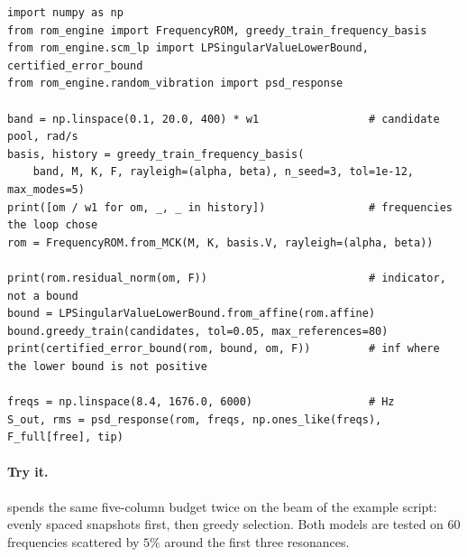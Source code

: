 \begin{lstlisting}[caption={Greedy training, the reduced model, indicators, a certified bound and a random-vibration RMS (K, M, C are free-dof matrices; F the load pattern).},label={lst:fr-run}]
import numpy as np
from rom_engine import FrequencyROM, greedy_train_frequency_basis
from rom_engine.scm_lp import LPSingularValueLowerBound, certified_error_bound
from rom_engine.random_vibration import psd_response

band = np.linspace(0.1, 20.0, 400) * w1                 # candidate pool, rad/s
basis, history = greedy_train_frequency_basis(
    band, M, K, F, rayleigh=(alpha, beta), n_seed=3, tol=1e-12, max_modes=5)
print([om / w1 for om, _, _ in history])                # frequencies the loop chose
rom = FrequencyROM.from_MCK(M, K, basis.V, rayleigh=(alpha, beta))

print(rom.residual_norm(om, F))                         # indicator, not a bound
bound = LPSingularValueLowerBound.from_affine(rom.affine)
bound.greedy_train(candidates, tol=0.05, max_references=80)
print(certified_error_bound(rom, bound, om, F))         # inf where the lower bound is not positive

freqs = np.linspace(8.4, 1676.0, 6000)                  # Hz
S_out, rms = psd_response(rom, freqs, np.ones_like(freqs), F_full[free], tip)
\end{lstlisting}

\paragraph{Try it.}  spends the same five-column budget twice on the beam of the example script: evenly spaced snapshots first, then greedy selection. Both models are tested on $60$ frequencies scattered by $5\%$ around the first three resonances.

